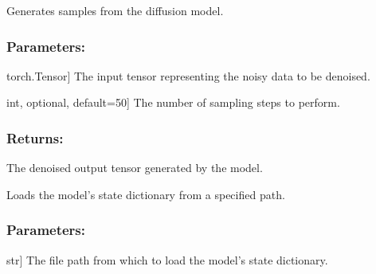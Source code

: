 \documentclass[a4paper,10pt,english]{sphinxmanual}
\begin{document}
\begin{fulllineitems}
\begin{fulllineitems}
\label{\detokenize{models:fireDiff.Models.diffusionmodel.DiffusionModel.diffusion_sampler}}
\pysigstartsignatures
{}
\pysigstopsignatures
\sphinxAtStartPar
Generates samples from the diffusion model.


\subsubsection{Parameters:}
\label{\detokenize{models:id20}}\begin{description}
\sphinxlineitem{x\_t}{[}torch.Tensor{]}
\sphinxAtStartPar
The input tensor representing the noisy data to be denoised.

\sphinxlineitem{num\_steps}{[}int, optional, default=50{]}
\sphinxAtStartPar
The number of sampling steps to perform.

\end{description}


\subsubsection{Returns:}
\label{\detokenize{models:id21}}\begin{description}
\sphinxAtStartPar
The denoised output tensor generated by the model.

\end{description}

\end{fulllineitems}


\begin{fulllineitems}
\label{\detokenize{models:fireDiff.Models.diffusionmodel.DiffusionModel.load_model}}
\pysigstartsignatures
{}
\pysigstopsignatures
\sphinxAtStartPar
Loads the model’s state dictionary from a specified path.


\subsubsection{Parameters:}
\label{\detokenize{models:id22}}\begin{description}
\sphinxlineitem{path}{[}str{]}
\sphinxAtStartPar
The file path from which to load the model’s state dictionary.


\end{description}
\end{fulllineitems}
\end{fulllineitems}
\end{document}
